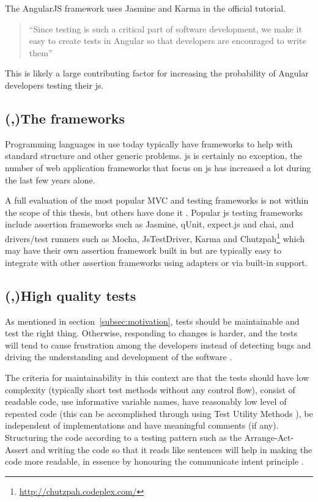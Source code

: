 \documentclass[11pt]{article}
\begin{document}
The AngularJS framework uses Jasmine and Karma in the official tutorial.

\begin{quote}
``Since testing is such a critical part of software development, we make it easy to create tests in Angular so that developers are encouraged to write them'' \cite{AngularTemplates}
\end{quote}

This is likely a large contributing factor for increasing the probability of Angular developers testing their \gls{js}.

\subsection{(,)The frameworks}
\label{subsec:frameworks}

Programming languages in use today typically have frameworks to help with standard structure and other generic problems. \gls{js} is certainly no exception, the number of web application frameworks that focus on \gls{js} has increased a lot during the last few years alone.

A full evaluation of the most popular MVC and testing frameworks is not within the scope of this thesis, but others have done it \cite{JackFranklin}\cite{SebastianPorto}. Popular \gls{js} testing frameworks include assertion frameworks such as Jasmine, qUnit, expect.js and chai, and drivers/test runners such as Mocha, JsTestDriver, Karma and Chutzpah\footnote{\url{http://chutzpah.codeplex.com/}} which may have their own assertion framework built in but are typically easy to integrate with other assertion frameworks using adapters or via built-in support.

\subsection{(,)High quality tests}
\label{subsec:quality}

As mentioned in section~\ref{subsec:motivation}, tests should be maintainable and test the right thing. Otherwise, responding to changes is harder, and the tests will tend to cause frustration among the developers instead of detecting bugs and driving the understanding and development of the software \cite{Clean}.

The criteria for maintainability in this context are that the tests should have low complexity (typically short test methods without any control flow), consist of readable code, use informative variable names, have reasonably low level of repeated code (this can be accomplished through using Test Utility Methods \cite[599]{TestPatterns}), be independent of implementations and have meaningful comments (if any). Structuring the code according to a testing pattern such as the Arrange-Act-Assert \cite{C2} and writing the code so that it reads like sentences will help in making the code more readable, in essence by honouring the communicate intent principle \cite[p.~41]{TestPatterns}.
\end{document}
